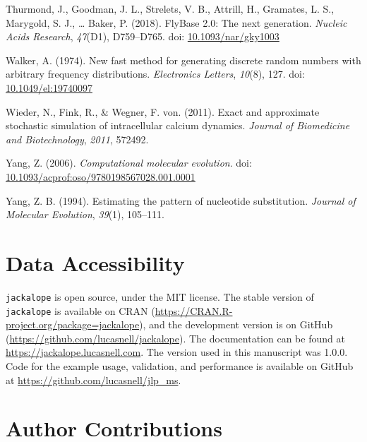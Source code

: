 \documentclass[12pt,]{article}
\begin{document}
\leavevmode\hypertarget{ref-Thurmond_2018}{}%
Thurmond, J., Goodman, J. L., Strelets, V. B., Attrill, H., Gramates, L. S., Marygold, S. J., \ldots{} Baker, P. (2018). FlyBase 2.0: The next generation. \emph{Nucleic Acids Research}, \emph{47}(D1), D759--D765. doi: \href{https://doi.org/10.1093/nar/gky1003}{10.1093/nar/gky1003}

\leavevmode\hypertarget{ref-Walker_1974}{}%
Walker, A. (1974). New fast method for generating discrete random numbers with arbitrary frequency distributions. \emph{Electronics Letters}, \emph{10}(8), 127. doi: \href{https://doi.org/10.1049/el:19740097}{10.1049/el:19740097}

\leavevmode\hypertarget{ref-Wieder_2011}{}%
Wieder, N., Fink, R., \& Wegner, F. von. (2011). Exact and approximate stochastic simulation of intracellular calcium dynamics. \emph{Journal of Biomedicine and Biotechnology}, \emph{2011}, 572492.

\leavevmode\hypertarget{ref-Yang_2006}{}%
Yang, Z. (2006). \emph{Computational molecular evolution}. doi: \href{https://doi.org/10.1093/acprof:oso/9780198567028.001.0001}{10.1093/acprof:oso/9780198567028.001.0001}

\leavevmode\hypertarget{ref-Yang_1994}{}%
Yang, Z. B. (1994). Estimating the pattern of nucleotide substitution. \emph{Journal of Molecular Evolution}, \emph{39}(1), 105--111.


\hypertarget{data-accessibility}{%
\section{Data Accessibility}\label{data-accessibility}}

\texttt{jackalope} is open source, under the MIT license.
The stable version of \texttt{jackalope} is available on CRAN
(\url{https://CRAN.R-project.org/package=jackalope}),
and the development version is on GitHub
(\url{https://github.com/lucasnell/jackalope}).
The documentation can be found at \url{https://jackalope.lucasnell.com}.
The version used in this manuscript was 1.0.0.
Code for the example usage, validation, and performance is available on GitHub at
\url{https://github.com/lucasnell/jlp_ms}.

\hypertarget{author-contributions}{%
\section{Author Contributions}\label{author-contributions}}
\end{document}
